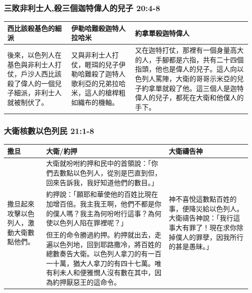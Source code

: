 \subsubsection{三敗非利士人,殺三個迦特偉人的兒子 20:4-8}
\begin{table}[H]
\centering
\begin{tabular}{p{4.15cm}|p{4.15cm}|p{8.75cm}}\hline\hline
西比該殺基色的細派&伊勒哈難殺迦特人拉哈米 &約拿單殺迦特偉人\\\hline\hline
後來，以色列人在基色與非利士人打仗，戶沙人西比該殺了偉人的一個兒子細派，非利士人就被制伏了。
&又與非利士人打仗，睚珥的兒子伊勒哈難殺了迦特人歌利亞的兄弟拉哈米，這人的槍桿粗如織布的機軸。
&又在迦特打仗，那裡有一個身量高大的人，手腳都是六指，共有二十四個指頭，他也是偉人的兒子。這人向以色列人罵陣，大衛的哥哥示米亞的兒子約拿單就殺了他。這三個人是迦特偉人的兒子，都死在大衛和他僕人的手下。\\\hline
\end{tabular}
\end{table}


\subsubsection{大衛核數以色列民 21:1-8}
\begin{table}[H]
\centering
\begin{tabular}{p{1.25cm}|p{12.25cm}|p{}}\hline\hline
撒旦&大衛/約押&大衛禱告神\\\hline
\multirow{3}{1.4cm}{撒旦起來攻擊以色列人，激動大衛數點他們。}&大衛就吩咐約押和民中的首領說：「你們去數點以色列人，從別是巴直到但，回來告訴我，我好知道他們的數目。」&\multirow{3}{3.2cm}{神不喜悅這數點百姓的事，便降災給以色列人。大衛禱告神說：「我行這事大有罪了！現在求你除掉僕人的罪孽，因我所行的甚是愚昧。」} \\\cline{2-2}
&約押說：「願耶和華使他的百姓比現在加增百倍。我主我王啊，他們不都是你的僕人嗎？我主為何吩咐行這事？為何使以色列人陷在罪裡呢？」&\\\cline{2-2}
&但王的命令勝過約押。約押就出去，走遍以色列地，回到耶路撒冷，將百姓的總數奏告大衛。以色列人拿刀的有一百一十萬，猶大人拿刀的有四十七萬。唯有利未人和便雅憫人沒有數在其中，因為約押厭惡王的這命令。&\\\hline
\end{tabular}
\end{table}

 



